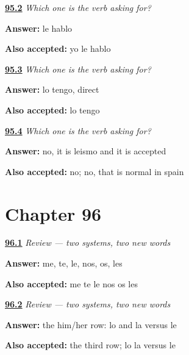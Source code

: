 \noindent\begin{minipage}[t]{\linewidth}
\raggedright
\hyperlink{review-ES-C46-cual-pide-speak}{\textbf{95.2}} \emph{Which one is the verb asking for?}\par
\small \textbf{Answer:} le hablo\par
\footnotesize \textbf{Also accepted:} yo le hablo
\end{minipage}\par\medskip

\noindent\begin{minipage}[t]{\linewidth}
\raggedright
\hyperlink{review-ES-C46-cual-pide-have}{\textbf{95.3}} \emph{Which one is the verb asking for?}\par
\small \textbf{Answer:} lo tengo, direct\par
\footnotesize \textbf{Also accepted:} lo tengo
\end{minipage}\par\medskip

\noindent\begin{minipage}[t]{\linewidth}
\raggedright
\hyperlink{review-ES-C46-cual-pide-leismo}{\textbf{95.4}} \emph{Which one is the verb asking for?}\par
\small \textbf{Answer:} no, it is leismo and it is accepted\par
\footnotesize \textbf{Also accepted:} no; no, that is normal in spain
\end{minipage}\par\medskip

\section*{Chapter 96}

\noindent\begin{minipage}[t]{\linewidth}
\raggedright
\hyperlink{review-ES-C46-repaso-dos-sistemas-indirect}{\textbf{96.1}} \emph{Review — two systems, two new words}\par
\small \textbf{Answer:} me, te, le, nos, os, les\par
\footnotesize \textbf{Also accepted:} me te le nos os les
\end{minipage}\par\medskip

\noindent\begin{minipage}[t]{\linewidth}
\raggedright
\hyperlink{review-ES-C46-repaso-dos-sistemas-row}{\textbf{96.2}} \emph{Review — two systems, two new words}\par
\small \textbf{Answer:} the him/her row: lo and la versus le\par
\footnotesize \textbf{Also accepted:} the third row; lo la versus le
\end{minipage}\par\medskip

